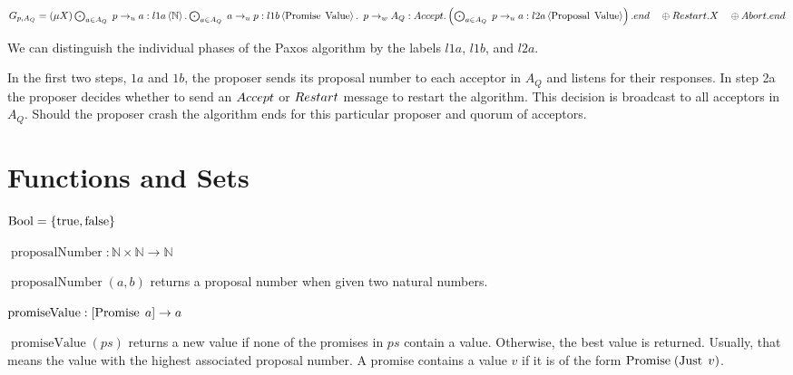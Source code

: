 $G_{p, A_Q} = \left(\mu X\right) \bigodot_{a \in A_Q}\; p \to_u a : l1a \left\langle \mathbb{N} \right\rangle . \bigodot_{a \in A_Q}\; a \to_u p : l1b \left\langle \operatorname{Promise}\; \operatorname{Value} \right\rangle .\\
\hspace*{0.5em}p \to_w A_Q : \mathnormal{Accept}.\left(\bigodot_{a \in A_Q}\; p \to_u a : l2a \left\langle \operatorname{Proposal}\; \operatorname{Value} \right\rangle\right).end\\
\hspace*{1em}\oplus \mathnormal{Restart}.X\\
\hspace*{1em}\oplus \mathnormal{Abort}.end$

We can distinguish the individual phases of the Paxos algorithm by the labels $l1a$, $l1b$, and $l2a$.

In the first two steps, $1a$ and $1b$, the proposer sends its proposal number to each acceptor in $A_Q$ and listens for their responses.
In step 2a the proposer decides whether to send an $\mathnormal{Accept}$ or $\mathnormal{Restart}$ message to restart the algorithm.
This decision is broadcast to all acceptors in $A_Q$.
Should the proposer crash the algorithm ends for this particular proposer and quorum of acceptors.

\section{Functions and Sets}
\newcommand{\Bool}[0]{\operatorname{Bool}}
\newcommand{\True}[0]{\operatorname{true}}
\newcommand{\False}[0]{\operatorname{false}}
\newcommand{\prNumber}[2]{\operatorname{proposalNumber}\left( #1, #2 \right)}
\newcommand{\promValue}[1]{\operatorname{promiseValue}\left(#1\right)}
\newcommand{\anyNack}[1]{\operatorname{anyNack}\left(#1\right)}
\newcommand{\promCount}[1]{\operatorname{promiseCount}\left(#1\right)}
\newcommand{\greaterThan}[2]{\operatorname{gt}\left(#1, #2\right)}
\newcommand{\greaterEqual}[2]{\operatorname{ge}\left(#1, #2\right)}
\newcommand{\nFromPr}[1]{\operatorname{nFromProposal}\left(#1 \right)}
\newcommand{\genAq}[3]{\operatorname{genA_Q}\left(#1, #2, #3\right)}

$\Bool = \Curly{\True, \False}$

$\operatorname{proposalNumber} : \mathbb{N} \times \mathbb{N} \to \mathbb{N}$

$\prNumber{a}{b}$ returns a proposal number when given two natural numbers.

$\operatorname{promiseValue} : [\operatorname{Promise}\; a] \to a$

$\promValue{ps}$ returns a new value if none of the promises in $ps$ contain a value. Otherwise, the best value is returned. Usually, that means the value with the highest associated proposal number.
A promise contains a value $v$ if it is of the form $\operatorname{Promise}\; (\operatorname{Just}\; v)$.

